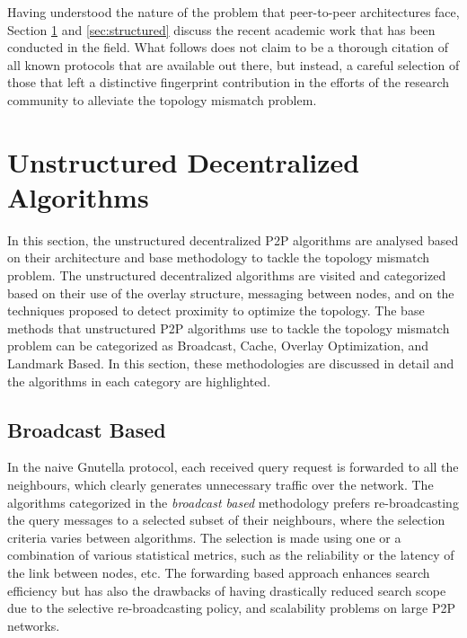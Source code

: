 \documentclass[acmcsur]{acmtrans2m}
\begin{document}
Having understood the nature of the problem that peer-to-peer architectures face,
Section \ref{sec:unstructured} and \ref{sec:structured} discuss the recent academic work that has been conducted
in the field. What follows does not claim
to be a thorough citation of all known protocols that are available out there,
but instead, a careful selection of those that left a distinctive fingerprint
contribution in the efforts of the research community to alleviate the topology
mismatch problem.

%

\section{Unstructured Decentralized Algorithms}\label{sec:unstructured}

In this section, the unstructured decentralized P2P algorithms are analysed based on their architecture and
base methodology to tackle the topology mismatch problem. The
unstructured decentralized algorithms are visited and categorized based on their
use of the overlay structure, messaging between nodes, and on the techniques
proposed to detect proximity to optimize the topology. 
The base methods that unstructured P2P algorithms use to tackle the topology
mismatch problem can be categorized as Broadcast, Cache, Overlay Optimization, 
and Landmark Based. In this section, these methodologies are discussed in
detail and the algorithms in each category are highlighted.


\subsection{Broadcast Based}

In the naive Gnutella protocol, each received query request is forwarded to all the
neighbours, which clearly generates unnecessary traffic over the network. The
algorithms categorized in the \textit{broadcast based} methodology prefers
re-broadcasting the query messages to a selected subset of their neighbours,
where the selection criteria varies between algorithms.
The selection is made using one or a
combination of various statistical metrics, such as the reliability or the latency
of the link between nodes, etc.
The forwarding based approach enhances search
efficiency but has also the drawbacks of having drastically reduced search scope
due to the selective re-broadcasting policy, and scalability problems on large
P2P networks.
\end{document}
